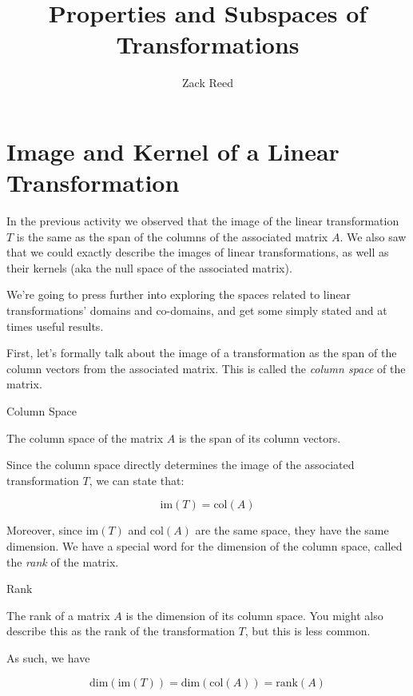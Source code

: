\documentclass{ximera}
\author{Zack Reed}
\title{Properties and Subspaces of Transformations}\license{CC BY-NC-SA 4.0}
\begin{document}
\begin{abstract}

\end{abstract}
\maketitle

\section*{Image and Kernel of a Linear Transformation}

In the previous activity we observed that the image of the linear transformation $T$ is the same as the span of the columns of the associated matrix $A$. We also saw that we could exactly describe the images of linear transformations, as well as their kernels (aka the null space of the associated matrix).

We're going to press further into exploring the spaces related to linear transformations' domains and co-domains, and get some simply stated and at times useful results.

First, let's formally talk about the image of a transformation as the span of the column vectors from the associated matrix. This is called the \emph{column space} of the matrix.

\begin{definition}{Column Space}

The column space of the matrix $A$ is the span of its column vectors.

Since the column space directly determines the image of the associated transformation $T$, we can state that:

$$\mbox{im}(T)=\mbox{col}(A)$$
\end{definition}

Moreover, since $\mbox{im}(T)$ and $\mbox{col}(A)$ are the same space, they have the same dimension. We have a special word for the dimension of the column space, called the \emph{rank} of the matrix. 

\begin{definition}{Rank}

  The rank of a matrix $A$ is the dimension of its column space. You might also describe this as the rank of the transformation $T$, but this is less common. 

  As such, we have

$$\mbox{dim}(\mbox{im}(T))=\mbox{dim}(\mbox{col}(A))=\mbox{rank}(A)$$
\end{definition}
 
\end{document}
